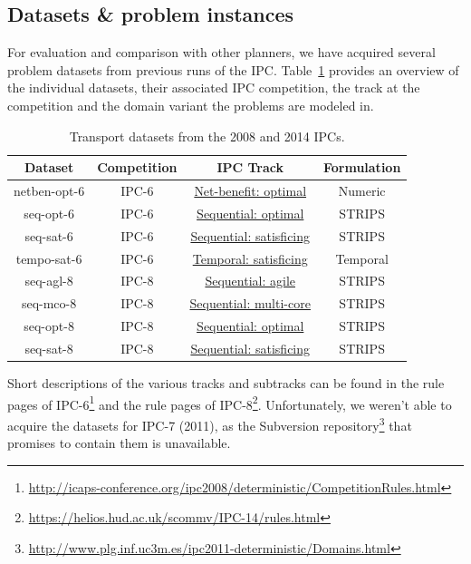 \subsection{Datasets \& problem instances}\label{datasets}

For evaluation and comparison with other planners, we have acquired several problem datasets from previous runs of the IPC.
Table~\ref{tab:ipc-datasets} provides an overview of the individual datasets, their associated IPC competition, the track at the competition and the domain variant the problems are modeled in.

\begin{table}[tb]
\begin{tabular}{c||ccc}
\textbf{Dataset} & \textbf{Competition} & \textbf{IPC Track} & \textbf{Formulation} \\ 
\midrule
\midrule
netben-opt-6 & IPC-6 & \href{http://icaps-conference.org/ipc2008/deterministic/NetBenefitOptimization.html}{Net-benefit: optimal} & Numeric \\ 
seq-opt-6 & IPC-6 & \href{http://icaps-conference.org/ipc2008/deterministic/SequentialOptimization.html}{Sequential: optimal} & STRIPS \\ 
seq-sat-6 & IPC-6 & \href{http://icaps-conference.org/ipc2008/deterministic/SequentialSatisficing.html}{Sequential: satisficing} & STRIPS \\ 
tempo-sat-6 & IPC-6 & \href{http://icaps-conference.org/ipc2008/deterministic/TemporalSatisficing.html}{Temporal: satisficing} & Temporal \\ 
\midrule
seq-agl-8 & IPC-8 & \href{https://helios.hud.ac.uk/scommv/IPC-14/seqagi.html}{Sequential: agile} & STRIPS \\ 
seq-mco-8 & IPC-8 & \href{https://helios.hud.ac.uk/scommv/IPC-14/seqmulti.html}{Sequential: multi-core} & STRIPS \\ 
seq-opt-8 & IPC-8 & \href{https://helios.hud.ac.uk/scommv/IPC-14/seqopt.html}{Sequential: optimal} & STRIPS \\ 
seq-sat-8 & IPC-8 & \href{https://helios.hud.ac.uk/scommv/IPC-14/seqsat.html}{Sequential: satisficing} & STRIPS \\ 
\end{tabular}
\caption{Transport datasets from the 2008 and 2014 IPCs.}
\label{tab:ipc-datasets}
\end{table}

Short descriptions of the various tracks and subtracks can be found in the rule pages of IPC-6\footnote{\url{http://icaps-conference.org/ipc2008/deterministic/CompetitionRules.html}}
and the rule pages of IPC-8\footnote{\url{https://helios.hud.ac.uk/scommv/IPC-14/rules.html}}.
Unfortunately, we weren't able to acquire the datasets for IPC-7 (2011), as the Subversion repository\footnote{\url{http://www.plg.inf.uc3m.es/ipc2011-deterministic/Domains.html}} that promises to contain them is unavailable.

